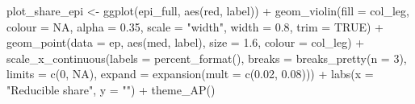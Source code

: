 \documentclass[
  11pt,
]{article}
\newenvironment{Shaded}{\begin{snugshade}}{\end{snugshade}}
\newcommand{\AttributeTok}[1]{\textcolor[rgb]{0.77,0.63,0.00}{#1}}
\newcommand{\ConstantTok}[1]{\textcolor[rgb]{0.00,0.00,0.00}{#1}}
\newcommand{\DecValTok}[1]{\textcolor[rgb]{0.00,0.00,0.81}{#1}}
\newcommand{\FloatTok}[1]{\textcolor[rgb]{0.00,0.00,0.81}{#1}}
\newcommand{\FunctionTok}[1]{\textcolor[rgb]{0.00,0.00,0.00}{#1}}
\newcommand{\NormalTok}[1]{#1}
\newcommand{\OtherTok}[1]{\textcolor[rgb]{0.56,0.35,0.01}{#1}}
\newcommand{\SpecialCharTok}[1]{\textcolor[rgb]{0.00,0.00,0.00}{#1}}
\newcommand{\StringTok}[1]{\textcolor[rgb]{0.31,0.60,0.02}{#1}}
\begin{document}
\begin{Shaded}
\begin{Highlighting}[]
\NormalTok{plot\_share\_epi }\OtherTok{\textless{}{-}} \FunctionTok{ggplot}\NormalTok{(epi\_full, }\FunctionTok{aes}\NormalTok{(red, label)) }\SpecialCharTok{+}
  \FunctionTok{geom\_violin}\NormalTok{(}\AttributeTok{fill =}\NormalTok{ col\_leg, }\AttributeTok{colour =} \ConstantTok{NA}\NormalTok{, }\AttributeTok{alpha =} \FloatTok{0.35}\NormalTok{, }\AttributeTok{scale =} \StringTok{"width"}\NormalTok{,}
              \AttributeTok{width =} \FloatTok{0.8}\NormalTok{, }\AttributeTok{trim =} \ConstantTok{TRUE}\NormalTok{) }\SpecialCharTok{+}
  \FunctionTok{geom\_point}\NormalTok{(}\AttributeTok{data =}\NormalTok{ ep, }\FunctionTok{aes}\NormalTok{(med, label), }\AttributeTok{size =} \FloatTok{1.6}\NormalTok{, }\AttributeTok{colour =}\NormalTok{ col\_leg) }\SpecialCharTok{+}
  \FunctionTok{scale\_x\_continuous}\NormalTok{(}\AttributeTok{labels =} \FunctionTok{percent\_format}\NormalTok{(), }\AttributeTok{breaks =} \FunctionTok{breaks\_pretty}\NormalTok{(}\AttributeTok{n =} \DecValTok{3}\NormalTok{),}
                     \AttributeTok{limits =} \FunctionTok{c}\NormalTok{(}\DecValTok{0}\NormalTok{, }\ConstantTok{NA}\NormalTok{),}
                     \AttributeTok{expand =} \FunctionTok{expansion}\NormalTok{(}\AttributeTok{mult =} \FunctionTok{c}\NormalTok{(}\FloatTok{0.02}\NormalTok{, }\FloatTok{0.08}\NormalTok{))) }\SpecialCharTok{+}
  \FunctionTok{labs}\NormalTok{(}\AttributeTok{x =} \StringTok{"Reducible share"}\NormalTok{, }\AttributeTok{y =} \StringTok{""}\NormalTok{) }\SpecialCharTok{+}
  \FunctionTok{theme\_AP}\NormalTok{()}


\end{Highlighting}
\end{Shaded}
\end{document}

